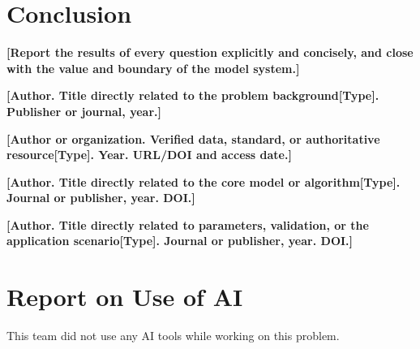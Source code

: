 \documentclass[12pt,letterpaper]{article}
\newcommand{\TemplateField}[1]{\textbf{[#1]}}
\newif\ifusedai
\newcommand{\AIModelName}{\TemplateField{AI tool name and version}}
\newcommand{\AIUsageSummary}{\TemplateField{e.g., language polishing, code debugging, and formatting checks}}
\begin{document}
\section{Conclusion}
\TemplateField{Report the results of every question explicitly and concisely, and close with the value and boundary of the model system.}
\label{text:counted-last}

\renewcommand{\refname}{References}
\begin{thebibliography}{99}
  \TemplateField{Author. Title directly related to the problem background[Type]. Publisher or journal, year.}

  \TemplateField{Author or organization. Verified data, standard, or authoritative resource[Type]. Year. URL/DOI and access date.}

  \TemplateField{Author. Title directly related to the core model or algorithm[Type]. Journal or publisher, year. DOI.}

  \TemplateField{Author. Title directly related to parameters, validation, or the application scenario[Type]. Journal or publisher, year. DOI.}

  \ifusedai
  \bibitem{ai-tool}
  \AIModelName.
  \newblock AI tool used for \AIUsageSummary; details in the Report on Use of AI.
  \fi
\end{thebibliography}

\label{page:counted-last}

\clearpage
\section*{Report on Use of AI}
\ifusedai
\TemplateField{State which AI tool and version was used, cited inline as \cite{ai-tool}, for what purpose and at which stage, the main prompting approach and usage process, what was adopted, what was manually revised, and how outputs were verified.}
\else
This team did not use any AI tools while working on this problem.
\fi
\end{document}
